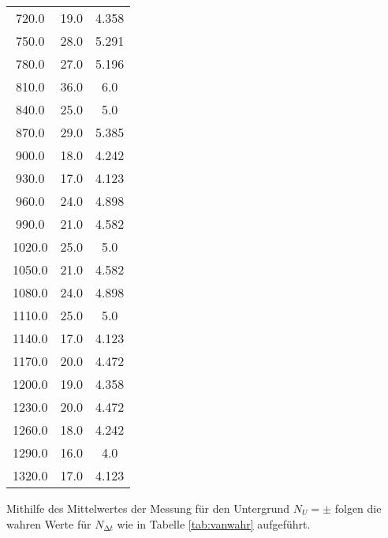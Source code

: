 \begin{table}
\begin{tabular}{c c c}
  720.0                & 19.0                 & 4.358  \\
  750.0                & 28.0                 & 5.291  \\
  780.0                & 27.0                 & 5.196  \\
  810.0                & 36.0                 & 6.0    \\
  840.0                & 25.0                 & 5.0    \\
  870.0                & 29.0                 & 5.385  \\
  900.0                & 18.0                 & 4.242  \\
  930.0                & 17.0                 & 4.123  \\
  960.0                & 24.0                 & 4.898  \\
  990.0                & 21.0                 & 4.582  \\
  1020.0               & 25.0                 & 5.0    \\
  1050.0               & 21.0                 & 4.582  \\
  1080.0               & 24.0                 & 4.898  \\
  1110.0               & 25.0                 & 5.0    \\
  1140.0               & 17.0                 & 4.123  \\
  1170.0               & 20.0                 & 4.472  \\
  1200.0               & 19.0                 & 4.358  \\
  1230.0               & 20.0                 & 4.472  \\
  1260.0               & 18.0                 & 4.242  \\
  1290.0               & 16.0                 & 4.0    \\
  1320.0               & 17.0                 & 4.123  \\
  \bottomrule
 \end{tabular}
\end{table}
\FloatBarrier

\noindent Mithilfe des Mittelwertes der Messung für den Untergrund $N_U = \pm $
folgen die wahren Werte für $N_{\increment t}$ wie in Tabelle \ref{tab:vanwahr} 
aufgeführt.

